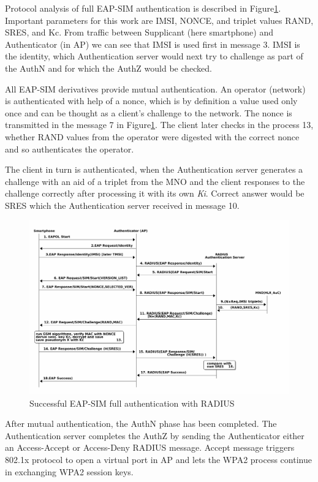 \documentclass[12pt,a4paper,english]{tutthesis}
\begin{document}
\begin{otherlanguage}{english}
Protocol analysis of full EAP-SIM authentication is described 
in Figure\ref{fig:eap-sim-radius}.
Important parameters for this work are IMSI, NONCE, and triplet values
RAND, SRES, and Kc. 
From traffic between Supplicant (here smartphone) and Authenticator (in AP)
we can see that IMSI is used first in message 3. IMSI is the
identity, which Authentication server would next try to challenge as
part of the AuthN and for which the AuthZ would be checked.







All EAP-SIM derivatives provide mutual authentication.
An operator (network) is authenticated with help of a nonce,
which is by definition a value used only once and can
be thought as a client's challenge to the network.
The nonce is transmitted in the message 7 in Figure\ref{fig:eap-sim-radius}.
The client later checks in the process 13, whether RAND values from
the operator were digested with the correct nonce and so authenticates
the operator.

The client in turn is authenticated, when the Authentication server
generates a challenge with an aid of a triplet from the MNO and the
client responses to the challenge correctly after processing it with
its own \emph{Ki}.  Correct answer would be SRES which the Authentication
server received in message 10.
\begin{figure}[htb]
\centering
\includegraphics[width=.9\linewidth]{eap-sim-radius.png}
\caption{\label{fig:eap-sim-radius}Successful EAP-SIM full authentication with RADIUS}
\end{figure}



After mutual authentication, the AuthN phase has been completed. The
Authentication server completes the AuthZ by sending the Authenticator either
an Access-Accept or Access-Deny RADIUS message. 
Accept message triggers 802.1x protocol to open a virtual port in AP
and lets the WPA2 process continue in exchanging WPA2 session keys. 


\end{otherlanguage}
\end{document}
